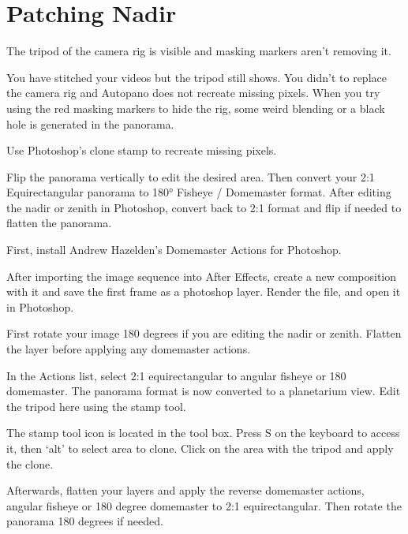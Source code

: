 \section{Patching Nadir}
\pagecolor{white}
\label{chap:48}
\begin{fullwidth}

\problem

{\large The tripod of the camera rig is visible and masking markers aren’t removing it. \par}

You have stitched your videos but the tripod still shows. You didn't \textbf{} to replace the camera rig and Autopano does not recreate missing pixels. When you try using the red masking markers to hide the rig, some weird blending or a black hole is generated in the panorama.

\solution

{\large Use Photoshop’s clone stamp to recreate missing pixels. \par}

Flip the panorama vertically to edit the desired area. Then convert your 2:1 Equirectangular panorama to 180° Fisheye / Domemaster format. After editing the nadir or zenith in Photoshop, convert back to 2:1 format and flip if needed to flatten the panorama.

First, install Andrew Hazelden's Domemaster Actions for Photoshop.

After importing the image sequence into After Effects, create a new composition with it and save the first frame as a photoshop layer. Render the file, and open it in Photoshop.


First rotate your image 180 degrees if you are editing the nadir or zenith. Flatten the layer before applying any domemaster actions.


In the Actions list, select 2:1 equirectangular to angular fisheye or 180 domemaster. The panorama format is now converted to a planetarium view. Edit the tripod here using the stamp tool.


\tip The stamp tool icon is located in the tool box. Press S on the keyboard to access it, then ‘alt’ to select area to clone. Click on the area with the tripod and apply the clone.

Afterwards, flatten your layers and apply the reverse domemaster actions, angular fisheye or 180 degree domemaster to 2:1 equirectangular. Then rotate the panorama 180 degrees if needed. 


\end{fullwidth}

